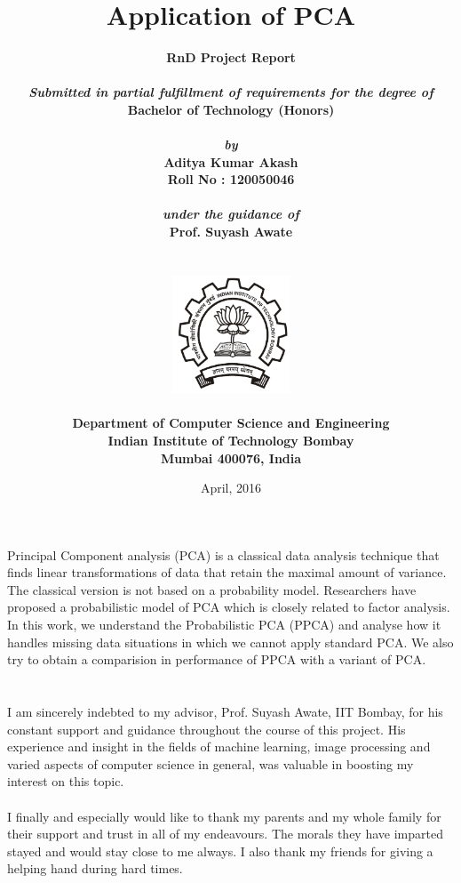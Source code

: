 \documentclass[12pt]{report}
\title{\textbf{Application of PCA}}
\author{
		\bf{RnD Project Report}\\
        \\
        \emph{Submitted in partial fulfillment of requirements for the degree of}\\
        \bf{Bachelor of Technology (Honors)}\\
        \\
        \emph{by}\\
		\bf{Aditya Kumar Akash}\\
        \bf{Roll No : 120050046}\\
        \\
        \emph{under the guidance of}\\
		\bf{Prof. Suyash Awate}\\
        \\\\
        \includegraphics[height=3.5cm]{./iitb_logo.jpg}\\
        \\
		\bf{Department of Computer Science and Engineering}\\
        \bf{Indian Institute of Technology Bombay}\\
        \bf{Mumbai 400076, India}\\
}
\date{April, 2016}
\makeatletter
\newcommand\frontmatter{%
  \cleardoublepage
  \pagenumbering{roman}}
\newcommand\mainmatter{%
  \cleardoublepage
  \pagenumbering{arabic}}
\makeatother
\begin{document}
\frontmatter
\maketitle
\pagebreak
\tableofcontents
\pagebreak

\chapter*{}
Principal Component analysis (PCA) is a classical data analysis technique that finds linear transformations of data that retain the maximal amount of variance. The classical version is not based on a probability model. Researchers have proposed a probabilistic model of PCA which is closely related to factor analysis. In this work, we understand the Probabilistic PCA (PPCA) and analyse how it handles missing data situations in which we cannot apply standard PCA. We also try to obtain a comparision in performance of PPCA with a variant of PCA.

\pagebreak

\chapter*{}
I am sincerely indebted to my advisor, Prof. Suyash Awate, IIT Bombay, for his constant support and guidance throughout the course of this project. His experience and insight in the fields of machine learning, image processing and varied aspects of computer science in general, was valuable in boosting my interest on this topic. \\\\
I finally and especially would like to thank my parents and my whole family for their support and trust in all of my endeavours. The morals they have imparted stayed and would stay close to me always. I also thank my friends for giving a helping hand during hard times.
\pagebreak


\mainmatter






	
\newpage
\end{document}
